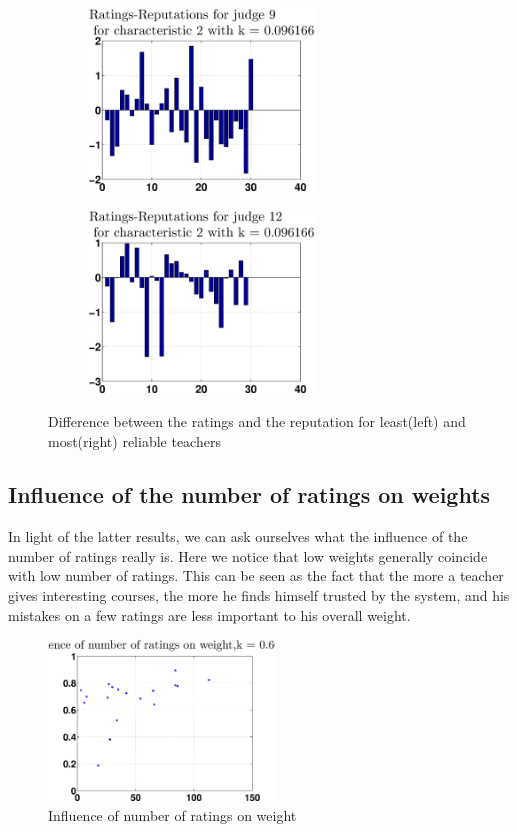 \documentclass[12pt,a4paper]{article}
\begin{document}
\begin{figure}[!h]
\centering
\begin{subfigure}[b]{0.48\textwidth}
\includegraphics[width = 6cm]{preprocessSelect/ppsdiffRaReLeastK3fb89e54e9211a25c2.eps}
\end{subfigure}
\begin{subfigure}[b]{0.48\textwidth}
\includegraphics[width = 6cm]{preprocessSelect/ppsdiffRaReMostK3fb89e54e9211a25c2.eps}
\end{subfigure}
\caption{\label{diffLM}Difference between the ratings and the reputation for least(left) and most(right) reliable teachers}
\end{figure}

\subsection*{Influence of the number of ratings on weights}
In light of the latter results, we can ask ourselves what the influence of the number of ratings really is. Here we notice that low weights generally coincide with low number of ratings. This can be seen as the fact that the more a teacher gives interesting courses, the more he finds himself trusted by the system, and his mistakes on a few ratings are less important to his overall weight.
\begin{figure}
\centering
\includegraphics[width = 6cm]{preprocessSelect/ppsnumRatvsWK6000.eps}
\caption{Influence of number of ratings on weight}
\end{figure}
\end{document}
